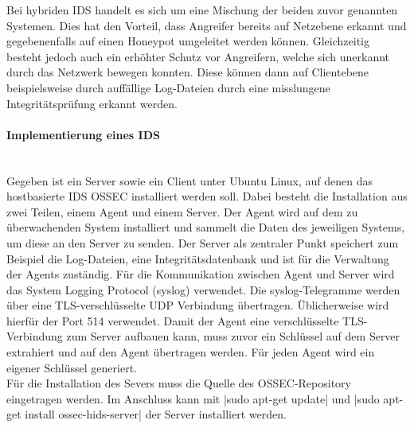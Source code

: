 \noindent Bei hybriden IDS handelt es sich um eine Mischung der beiden zuvor genannten Systemen. Dies hat den Vorteil, dass Angreifer bereits auf Netzebene erkannt und gegebenenfalls auf einen Honeypot umgeleitet werden können. Gleichzeitig besteht jedoch auch ein erhöhter Schutz vor Angreifern, welche sich unerkannt durch das Netzwerk bewegen konnten. Diese können dann auf Clientebene beispielsweise durch auffällige Log-Dateien durch eine misslungene Integritätsprüfung erkannt werden.\\

\paragraph{Implementierung eines IDS}
\noindent \\Gegeben ist ein Server sowie ein Client unter Ubuntu Linux, auf denen das hostbasierte IDS OSSEC installiert werden soll. Dabei besteht die Installation aus zwei Teilen, einem Agent und einem Server. Der Agent wird auf dem zu überwachenden System installiert und sammelt die Daten des jeweiligen Systems, um diese an den Server zu senden. Der Server als zentraler Punkt speichert zum Beispiel die Log-Dateien, eine Integritätsdatenbank und ist für die Verwaltung der Agents zuständig. Für die Kommunikation zwischen Agent und Server wird das System Logging Protocol (syslog) verwendet. Die syslog-Telegramme werden über eine TLS-verschlüsselte UDP Verbindung übertragen. Üblicherweise wird hierfür der Port 514 verwendet. Damit der Agent eine verschlüsselte TLS-Verbindung zum Server aufbauen kann, muss zuvor ein Schlüssel auf dem Server extrahiert und auf den Agent übertragen werden. Für jeden Agent wird ein eigener Schlüssel generiert. \\

Für die Installation des Severs muss die Quelle des OSSEC-Repository eingetragen werden. Im Anschluss kann mit |sudo apt-get update| und |sudo apt-get install ossec-hids-server| der Server installiert werden.  
 
  
 

